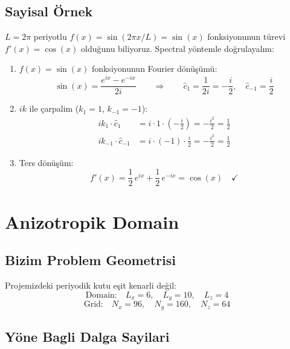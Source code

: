 \subsection{Sayisal Örnek}

$L = 2\pi$ periyotlu $f(x) = \sin(2\pi x / L) = \sin(x)$ fonksiyonunun türevi $f'(x) = \cos(x)$ olduğunu biliyoruz. Spectral yöntemle doğrulayalım:

\begin{enumerate}
\item $f(x) = \sin(x)$ fonksiyonunun Fourier dönüşümü:
\begin{equation}
\sin(x) = \frac{e^{ix} - e^{-ix}}{2i} \qquad\Rightarrow\qquad \hat{c}_1 = \frac{1}{2i} = -\frac{i}{2},\quad \hat{c}_{-1} = \frac{i}{2}
\end{equation}
\item $ik$ ile çarpalim ($k_1 = 1$, $k_{-1} = -1$):
\begin{align}
ik_1 \cdot \hat{c}_1 &= i\cdot 1 \cdot\left(-\frac{i}{2}\right) = -\frac{i^2}{2} = \frac{1}{2} \\
ik_{-1}\cdot\hat{c}_{-1} &= i\cdot(-1)\cdot\frac{i}{2} = -\frac{i^2}{2} = \frac{1}{2}
\end{align}
\item Ters dönüşüm:
\begin{equation}
f'(x) = \frac{1}{2}\,e^{ix} + \frac{1}{2}\,e^{-ix} = \cos(x) \quad\checkmark
\end{equation}
\end{enumerate}


\section{Anizotropik Domain}
\label{sec:anisotropic}

\subsection{Bizim Problem Geometrisi}

Projemizdeki periyodik kutu eşit kenarli değil:
\begin{equation}
\text{Domain:}\quad L_x = 6, \quad L_y = 10, \quad L_z = 4
\end{equation}
\begin{equation}
\text{Grid:}\quad N_x = 96, \quad N_y = 160, \quad N_z = 64
\end{equation}

\subsection{Yöne Bagli Dalga Sayilari}

